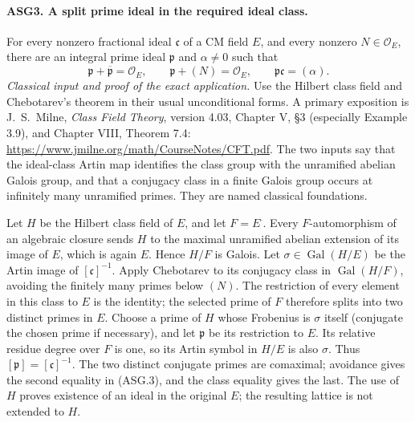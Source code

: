 \paragraph{ASG3. A split prime ideal in the required ideal class.}
\label{claim:ASG3}
For every nonzero fractional ideal \(\mathfrak c\) of a CM
field \(E\), and every nonzero \(N\in\mathcal O_E\), there
are an integral prime ideal \(\mathfrak p\) and \(\alpha\ne0\)
such that
\[
 \mathfrak p+\overline{\mathfrak p}=\mathcal O_E,
 \qquad \mathfrak p+(N)=\mathcal O_E,
 \qquad \mathfrak p\mathfrak c=(\alpha).
\tag{ASG.3}
\]
\emph{Classical input and proof of the exact application.}
Use the Hilbert class field and Chebotarev's theorem in their usual
unconditional forms.  A primary exposition is J.~S.~Milne,
\emph{Class Field Theory}, version 4.03, Chapter V, \S3
(especially Example 3.9), and Chapter VIII, Theorem 7.4:
\url{https://www.jmilne.org/math/CourseNotes/CFT.pdf}.
The two inputs say that the ideal-class Artin map identifies the
class group with the unramified abelian Galois group, and that a
conjugacy class in a finite Galois group occurs at infinitely many
unramified primes.  They are named classical foundations.

Let \(H\) be the Hilbert class field of \(E\), and let
\(F=E^{\bar{\ }}\).  Every \(F\)-automorphism of an algebraic
closure sends \(H\) to the maximal unramified abelian extension
of its image of \(E\), which is again \(E\).  Hence \(H/F\)
is Galois.  Let \(\sigma\in\operatorname{Gal}(H/E)\) be the
Artin image of \([\mathfrak c]^{-1}\).  Apply Chebotarev to
its conjugacy class in \(\operatorname{Gal}(H/F)\), avoiding
the finitely many primes below \((N)\).  The restriction of every
element in this class to \(E\) is the identity; the selected prime
of \(F\) therefore splits into two distinct primes in \(E\).
Choose a prime of \(H\) whose Frobenius is \(\sigma\) itself
(conjugate the chosen prime if necessary), and let \(\mathfrak p\)
be its restriction to \(E\).  Its relative residue degree over
\(F\) is one, so its Artin symbol in \(H/E\) is also
\(\sigma\).  Thus \([\mathfrak p]=[\mathfrak c]^{-1}\).
The two distinct conjugate primes are comaximal; avoidance gives the
second equality in (ASG.3), and the class equality gives the last.
The use of \(H\) proves existence of an ideal in the original
\(E\); the resulting lattice is not extended to \(H\).

